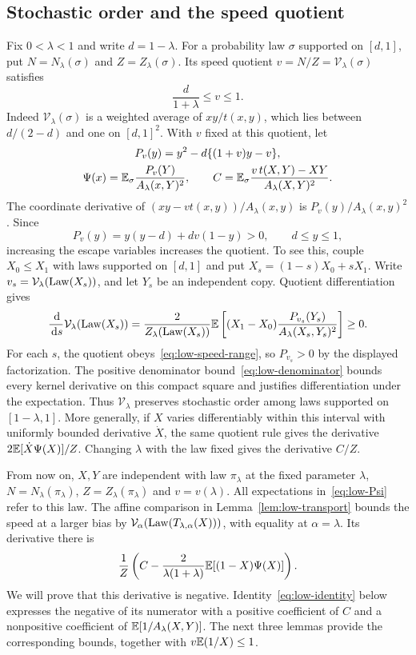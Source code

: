 \subsection{Stochastic order and the speed quotient}
Fix $0<\lambda<1$ and write $d=1-\lambda$. For a probability law $\sigma$ supported on $[d,1]$, put $N=N_\lambda(\sigma)$ and $Z=Z_\lambda(\sigma)$. Its speed quotient $v=N/Z=\mathcal V_\lambda(\sigma)$ satisfies
\begin{equation}\label{eq:low-speed-range}
 \frac{d}{1+\lambda}\le v\le1.
\end{equation}
Indeed $\mathcal V_\lambda(\sigma)$ is a weighted average of $xy/t(x,y)$, which lies between $d/(2-d)$ and one on $[d,1]^2$. With $v$ fixed at this quotient, let
\begin{equation}\label{eq:low-Psi}
 \begin{gathered}
 P_v(y)=y^2-d\{(1+v)y-v\},\\
 \Psi(x)=\mathbb E_\sigma\frac{P_v(Y)}{A_\lambda(x,Y)^2},\qquad
 C=\mathbb E_\sigma\frac{v\,t(X,Y)-XY}{A_\lambda(X,Y)^2}.
 \end{gathered}
\end{equation}
The coordinate derivative of $(xy-vt(x,y))/A_\lambda(x,y)$ is $P_v(y)/A_\lambda(x,y)^2$. Since
\begin{equation*}
 P_v(y)=y(y-d)+dv(1-y)>0,\qquad d\le y\le1,
\end{equation*}
increasing the escape variables increases the quotient. To see this, couple $X_0\le X_1$ with laws supported on $[d,1]$ and put $X_s=(1-s)X_0+sX_1$. Write $v_s=\mathcal V_\lambda(\operatorname{Law}(X_s))$, and let $Y_s$ be an independent copy. Quotient differentiation gives
\[
 \frac{\,\mathrm d}{\,\mathrm d s}\mathcal V_\lambda(\operatorname{Law}(X_s))
 =\frac{2}{Z_\lambda(\operatorname{Law}(X_s))}
 \mathbb E\left[(X_1-X_0)
 \frac{P_{v_s}(Y_s)}{A_\lambda(X_s,Y_s)^2}\right]\ge0.
\]
For each $s$, the quotient obeys~\eqref{eq:low-speed-range}, so $P_{v_s}>0$ by the displayed factorization. The positive denominator bound~\eqref{eq:low-denominator} bounds every kernel derivative on this compact square and justifies differentiation under the expectation. Thus $\mathcal V_\lambda$ preserves stochastic order among laws supported on $[1-\lambda,1]$. More generally, if $X$ varies differentiably within this interval with uniformly bounded derivative $\dot X$, the same quotient rule gives the derivative $2\mathbb E[\dot X\Psi(X)]/Z$. Changing $\lambda$ with the law fixed gives the derivative $C/Z$.

From now on, $X,Y$ are independent with law $\pi_\lambda$ at the fixed parameter $\lambda$, $N=N_\lambda(\pi_\lambda)$, $Z=Z_\lambda(\pi_\lambda)$ and $v=v(\lambda)$. All expectations in~\eqref{eq:low-Psi} refer to this law. The affine comparison in Lemma~\ref{lem:low-transport} bounds the speed at a larger bias by $\mathcal V_\alpha(\operatorname{Law}(T_{\lambda,\alpha}(X)))$, with equality at $\alpha=\lambda$. Its derivative there is
\[
 \frac1Z\left(C-\frac{2}{\lambda(1+\lambda)}
 \mathbb E[(1-X)\Psi(X)]\right).
\]
We will prove that this derivative is negative. Identity~\eqref{eq:low-identity} below expresses the negative of its numerator with a positive coefficient of $C$ and a nonpositive coefficient of $\mathbb E[1/A_\lambda(X,Y)]$. The next three lemmas provide the corresponding bounds, together with $v\mathbb E(1/X)\le1$.

